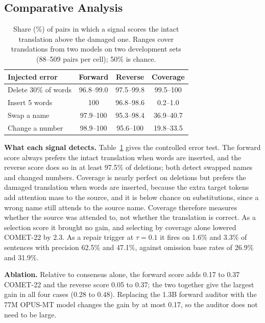 \documentclass[11pt]{article}
\begin{document}
\subsection{Comparative Analysis}
\label{subsec:comparative_analysis}
\begin{table}[t]
\centering
\small
\begin{tabular}{lccc}
\toprule
Injected error & Forward & Reverse & Coverage \\
\midrule
Delete 30\% of words  & 96.8--99.0 & 97.5--99.8 & 99.5--100 \\
Insert 5 words        & 100        & 96.8--98.6 & 0.2--1.0 \\
Swap a name           & 97.9--100  & 95.3--98.4 & 36.9--40.7 \\
Change a number       & 98.9--100  & 95.6--100  & 19.8--33.5 \\
\bottomrule
\end{tabular}
\caption{Share (\%) of pairs in which a signal scores the intact translation above the damaged one. Ranges cover translations from two models on two development sets (88--509 pairs per cell); 50\% is chance.}
\label{tab:error_matrix}
\end{table}

\textbf{What each signal detects.} Table~\ref{tab:error_matrix} gives the controlled error test. The forward score always prefers the intact translation when words are inserted, and the reverse score does so in at least 97.5\% of deletions; both detect swapped names and changed numbers. Coverage is nearly perfect on deletions but prefers the damaged translation when words are inserted, because the extra target tokens add attention mass to the source, and it is below chance on substitutions, since a wrong name still attends to the source name. Coverage therefore measures whether the source was attended to, not whether the translation is correct. As a selection score it brought no gain, and selecting by coverage alone lowered COMET-22 by 2.3. As a repair trigger at $\tau=0.1$ it fires on 1.6\% and 3.3\% of sentences with precision 62.5\% and 47.1\%, against omission base rates of 26.9\% and 31.9\%.

\textbf{Ablation.} Relative to consensus alone, the forward score adds 0.17 to 0.37 COMET-22 and the reverse score 0.05 to 0.37; the two together give the largest gain in all four cases (0.28 to 0.48). Replacing the 1.3B forward auditor with the 77M OPUS-MT model changes the gain by at most 0.17, so the auditor does not need to be large.
\end{document}
